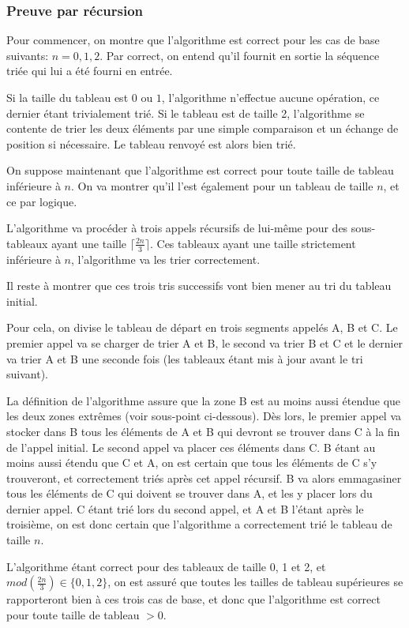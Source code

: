 \documentclass[a4paper, 12pt]{article}
\begin{document}
	\subsubsection*{Preuve par récursion}
	Pour commencer, on montre que l'algorithme est correct pour les cas de base suivants: \(n = 0, 1, 2\). Par \og correct\fg{}, on entend qu'il fournit en sortie la séquence triée qui lui a été fourni en entrée.\par
	Si la taille du tableau est \(0\) ou \(1\), l'algorithme n'effectue aucune opération, ce dernier étant trivialement trié. Si le tableau est de taille 2, l'algorithme se contente de trier les deux éléments par une simple comparaison et un échange de position si nécessaire. Le tableau renvoyé est alors bien trié.\par
	On suppose maintenant que l'algorithme est correct pour toute taille de tableau inférieure à \(n\). On va montrer qu'il l'est également pour un tableau de taille \(n\), et ce par logique.\par
	L'algorithme va procéder à trois appels récursifs de lui-même pour des sous-tableaux ayant une taille \(\lceil\frac{2n}{3}\rceil\). Ces tableaux ayant une taille strictement inférieure à \(n\), l'algorithme va les trier correctement.\par
	Il reste à montrer que ces trois tris successifs vont bien mener au tri du tableau initial.\par
	Pour cela, on divise le tableau de départ en trois segments appelés A, B et C. Le premier appel va se charger de trier A et B, le second va trier B et C et le dernier va trier A et B une seconde fois (les tableaux étant mis à jour avant le tri suivant).\par
	La définition de l'algorithme assure que la zone B est au moins aussi étendue que les deux zones extrêmes (voir sous-point ci-dessous). Dès lors, le premier appel va stocker dans B tous les éléments de A et B qui devront se trouver dans C à la fin de l'appel initial. Le second appel va placer ces éléments dans C. B étant au moins aussi étendu que C et A, on est certain que tous les éléments de C s'y trouveront, et correctement triés après cet appel récursif. B va alors emmagasiner tous les éléments de C qui doivent se trouver dans A, et les y placer lors du dernier appel. C étant trié lors du second appel, et A et B l'étant après le troisième, on est donc certain que l'algorithme a correctement trié le tableau de taille \(n\).\par
	L'algorithme étant correct pour des tableaux de taille 0, 1 et 2, et $mod(\frac{2n}{3})\in\{0,1,2\}$, on est assuré que toutes les tailles de tableau supérieures se rapporteront bien à ces trois cas de base, et donc que l'algorithme est correct pour toute taille de tableau \(> 0\).
\end{document}

